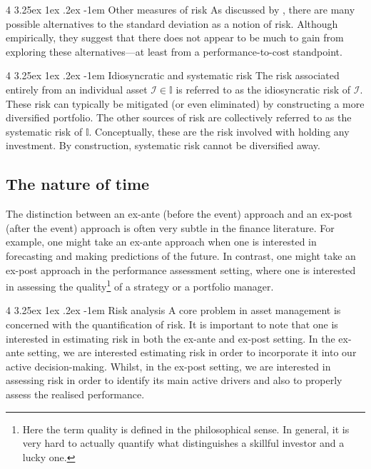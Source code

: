 \documentclass[12pt]{article}
\makeatletter
\renewcommand\paragraph{%
	\@startsection{paragraph}
	{4}
	{\z@}
	{3.25ex \@plus1ex \@minus.2ex}
	{-1em}
	{\normalfont\normalsize\bfseries\maybe@addperiod}%
}
\newcommand{\maybe@addperiod}[1]{%
	#1\@addpunct{.}%
}
\makeatother
\begin{document}
\paragraph{Other measures of risk} As discussed by \citet[Chapter 3]{grinold1999}, there are many possible alternatives to the standard deviation as a notion of risk. Although empirically, they suggest that there does not appear to be much to gain from exploring these alternatives---at least from a performance-to-cost standpoint.

\paragraph{Idiosyncratic and systematic risk} The risk associated entirely from an individual asset $\mathcal{I} \in \mathbb{I}$ is referred to as the idiosyncratic risk of $\mathcal{I}$. These risk can typically be mitigated (or even eliminated) by constructing a more diversified portfolio. The other sources of risk are collectively referred to as the systematic risk of $\mathbb{I}$. Conceptually, these are the risk involved with holding any investment. By construction, systematic risk cannot be diversified away. 
\subsection{The nature of time}
The distinction between an ex-ante (before the event) approach and an ex-post (after the event) approach is often very subtle in the finance literature. For example, one might take an ex-ante approach when one is interested in forecasting and making predictions of the future. In contrast, one might take an ex-post approach in the performance assessment setting, where one is interested in assessing the quality\footnote{Here the term quality is defined in the philosophical sense. In general, it is very hard to actually quantify what distinguishes a skillful investor and a lucky one.} of a strategy or a portfolio manager.

\paragraph{Risk analysis} A core problem in asset management is concerned with the quantification of risk. It is important to note that one is interested in estimating risk in both the ex-ante and ex-post setting. In the ex-ante setting, we are interested estimating risk in order to incorporate it into our active decision-making. Whilst, in the ex-post setting, we are interested in assessing risk in order to identify its main active drivers and also to properly assess the realised performance.
\end{document}

